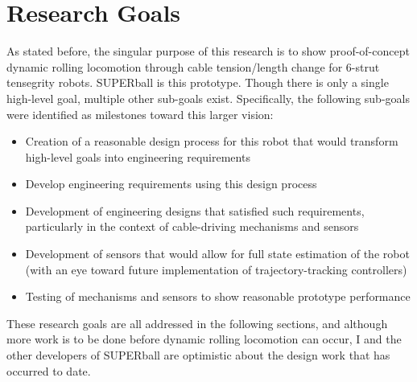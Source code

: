 \documentclass[12pt]{report}
\begin{document}

\section{Research Goals}

As stated before, the singular purpose of this research is to show proof-of-concept dynamic rolling locomotion through cable tension/length change for 6-strut tensegrity robots.
SUPERball is this prototype.
Though there is only a single high-level goal, multiple other sub-goals exist.
Specifically, the following sub-goals were identified as milestones toward this larger vision:

\begin{itemize}
  \setlength{\itemsep}{0cm}%
  \setlength{\parskip}{0cm}%
  \item Creation of a reasonable design process for this robot that would transform high-level goals into engineering requirements
  \item Develop engineering requirements using this design process
  \item Development of engineering designs that satisfied such requirements, particularly in the context of cable-driving mechanisms and sensors
  \item Development of sensors that would allow for full state estimation of the robot (with an eye toward future implementation of trajectory-tracking controllers)
  \item Testing of mechanisms and sensors to show reasonable prototype performance
\end{itemize}

These research goals are all addressed in the following sections, and although more work is to be done before dynamic rolling locomotion can occur, I and the other developers of SUPERball are optimistic about the design work that has occurred to date.
\end{document}
